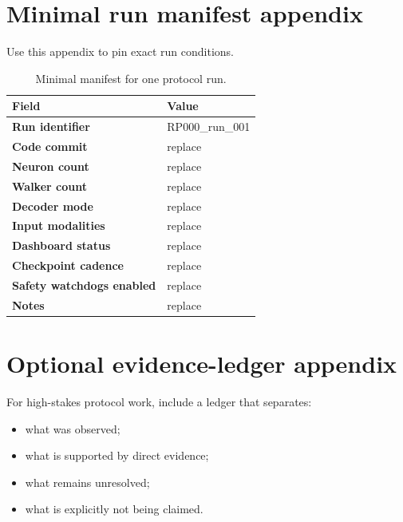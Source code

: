 \documentclass[11pt]{article}
\begin{document}
\appendix

\section{Minimal run manifest appendix}

Use this appendix to pin exact run conditions.

\begin{table}[H]
\centering
\caption{Minimal manifest for one protocol run.}
\begin{tabularx}{\textwidth}{>{\bfseries}p{} X}
\toprule
Field & Value \\
\midrule
Run identifier & RP000\_run\_001 \\
Code commit & replace \\
Neuron count & replace \\
Walker count & replace \\
Decoder mode & replace \\
Input modalities & replace \\
Dashboard status & replace \\
Checkpoint cadence & replace \\
Safety watchdogs enabled & replace \\
Notes & replace \\
\bottomrule
\end{tabularx}
\end{table}

\section{Optional evidence-ledger appendix}

For high-stakes protocol work, include a ledger that separates:
\begin{itemize}[leftmargin=1.5em]
  \item what was observed;
  \item what is supported by direct evidence;
  \item what remains unresolved;
  \item what is explicitly not being claimed.
\end{itemize}
\end{document}

